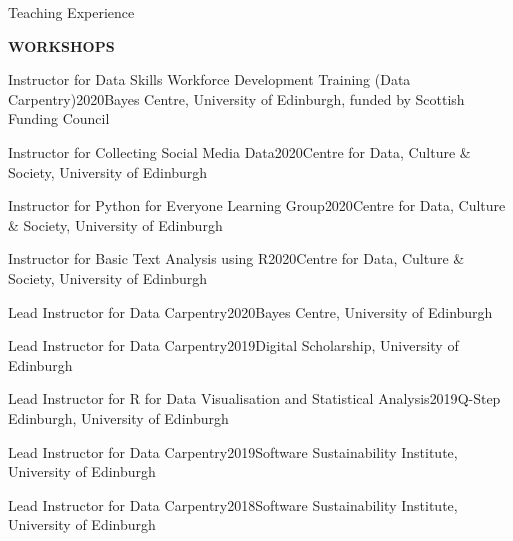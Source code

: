 \documentclass{resume} %
\begin{document}
\begin{rSection}{Teaching Experience}

{\bf WORKSHOPS} \hfill 

\begin{rSubsectionTeaching}{Instructor for Data Skills Workforce Development Training (Data Carpentry)}{2020}{Bayes Centre, University of Edinburgh, funded by Scottish Funding Council}{}
\end{rSubsectionTeaching}

\begin{rSubsectionTeaching}{Instructor for Collecting Social Media Data}{2020}{Centre for Data, Culture \& Society, University of Edinburgh}{}
\end{rSubsectionTeaching}

\begin{rSubsectionTeaching}{Instructor for Python for Everyone Learning Group}{2020}{Centre for Data, Culture \& Society, University of Edinburgh}{}
\end{rSubsectionTeaching}

\begin{rSubsectionTeaching}{Instructor for Basic Text Analysis using R}{2020}{Centre for Data, Culture \& Society, University of Edinburgh}{}
\end{rSubsectionTeaching}

\begin{rSubsectionTeaching}{Lead Instructor for Data Carpentry}{2020}{Bayes Centre, University of Edinburgh}{}
\end{rSubsectionTeaching}

\begin{rSubsectionTeaching}{Lead Instructor for Data Carpentry}{2019}{Digital Scholarship, University of Edinburgh}{}
\end{rSubsectionTeaching}

\begin{rSubsectionTeaching}{Lead Instructor for R for Data Visualisation and Statistical Analysis}{2019}{Q-Step Edinburgh, University of Edinburgh}{}
\end{rSubsectionTeaching}

\begin{rSubsectionTeaching}{Lead Instructor for Data Carpentry}{2019}{Software Sustainability Institute, University of Edinburgh}{}
\end{rSubsectionTeaching}

\begin{rSubsectionTeaching}{Lead Instructor for Data Carpentry}{2018}{Software Sustainability Institute, University of Edinburgh}{}
\end{rSubsectionTeaching}


\end{rSection}
\end{document}
